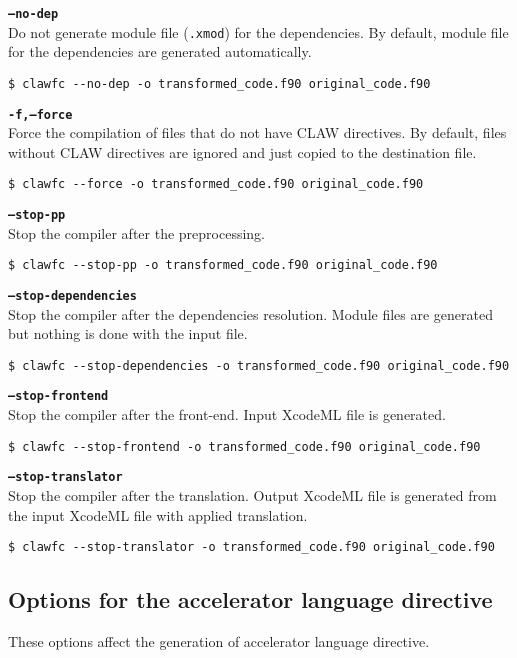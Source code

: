\documentclass{article}
\begin{document}
\textbf{\texttt{--no-dep}}\\
Do not generate module file (\texttt{.xmod}) for the dependencies. By default, module file for the dependencies are generated automatically. 
\begin{lstlisting}
$ clawfc --no-dep -o transformed_code.f90 original_code.f90
\end{lstlisting}

\textbf{\texttt{-f,--force}}\\
Force the compilation of files that do not have CLAW directives. By default, files without CLAW directives are ignored and just copied to the destination file. 
\begin{lstlisting}
$ clawfc --force -o transformed_code.f90 original_code.f90
\end{lstlisting}

\textbf{\texttt{--stop-pp}}\\
Stop the compiler after the preprocessing.
\begin{lstlisting}
$ clawfc --stop-pp -o transformed_code.f90 original_code.f90
\end{lstlisting}

\textbf{\texttt{--stop-dependencies}}\\
Stop the compiler after the dependencies resolution. Module files are generated but nothing is done with the input file. 
\begin{lstlisting}
$ clawfc --stop-dependencies -o transformed_code.f90 original_code.f90
\end{lstlisting}

\textbf{\texttt{--stop-frontend}}\\
Stop the compiler after the front-end. Input XcodeML file is generated. 
\begin{lstlisting}
$ clawfc --stop-frontend -o transformed_code.f90 original_code.f90
\end{lstlisting}

\textbf{\texttt{--stop-translator}}\\
Stop the compiler after the translation. Output XcodeML file is generated from the input XcodeML file with applied translation. 
\begin{lstlisting}
$ clawfc --stop-translator -o transformed_code.f90 original_code.f90
\end{lstlisting}

\subsection{Options for the accelerator language directive}
These options affect the generation of accelerator language directive.
\end{document}
